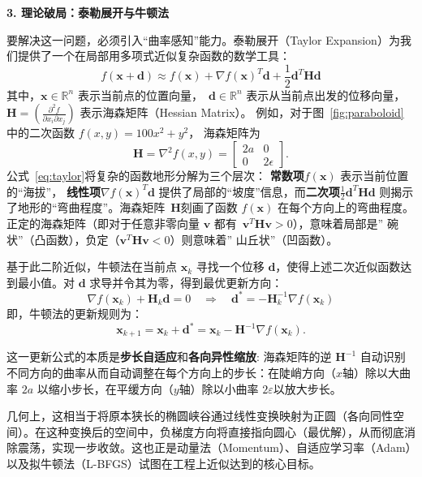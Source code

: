 \textbf{3. 理论破局：泰勒展开与牛顿法}

要解决这一问题，必须引入“曲率感知”能力。泰勒展开（Taylor Expansion）为我们提供了一个在局部用多项式近似复杂函数的数学工具：
\begin{equation}\label{eq:taylor}
f(\mathbf{x}+\mathbf{d}) \approx f(\mathbf{x}) + \nabla f(\mathbf{x})^T\mathbf{d}
+ \frac{1}{2}\mathbf{d}^T\mathbf{H}\mathbf{d}
\end{equation}
其中，$\mathbf{x}\in \mathbb{R}^n$ 表示当前点的位置向量，~$\mathbf{d}\in \mathbb{R}^n$ 表示从当前点出发的位移向量，$\mathbf{H} = \left(\frac{\partial^2 f}{\partial x_i \partial x_j} \right)$ 表示海森矩阵（Hessian Matrix）。 例如，对于图~\ref{fig:paraboloid} 中的二次函数 $ f(x,y) = 100 x^2 + y^2$，  海森矩阵为
\[
\mathbf{H} = \nabla^2 f(x,y) =
\begin{bmatrix}
2a & 0 \\
0 & 2\epsilon
\end{bmatrix}.
\]
公式~\eqref{eq:taylor}将复杂的函数地形分解为三个层次：
\textbf{常数项}$f(\mathbf{x})$ 表示当前位置的``海拔''，
\textbf{线性项}$\nabla f(\mathbf{x})^T\mathbf{d}$ 提供了局部的``坡度''信息，而\textbf{二次项}$\frac{1}{2}\mathbf{d}^T\mathbf{H}\mathbf{d}$ 则揭示了地形的``弯曲程度''。海森矩阵~$\mathbf{H}  $刻画了函数 $f(\mathbf{x})$ 在每个方向上的弯曲程度。正定的海森矩阵（即对于任意非零向量 $\mathbf{v}$ 都有~$\mathbf{v}^T \mathbf{H} \mathbf{v} >0$），意味着局部是” 碗状”（凸函数），负定（$\mathbf{v}^T \mathbf{H} \mathbf{v}<0$）则意味着” 山丘状”（凹函数）。

基于此二阶近似，牛顿法在当前点 $\mathbf{x}_k$ 寻找一个位移 $\mathbf{d}$，使得上述二次近似函数达到最小值。对 $\mathbf{d}$ 求导并令其为零，得到最优更新方向：
$$
\nabla f(\mathbf{x}_k) + \mathbf{H}_k \mathbf{d} = 0 \quad \Rightarrow \quad \mathbf{d}^* = -\mathbf{H}_k^{-1} \nabla f(\mathbf{x}_k)
$$
即，牛顿法的更新规则为：
$$
\mathbf{x}_{k+1} = \mathbf{x}_k + \mathbf{d}^* = \mathbf{x}_k - \mathbf{H}^{-1} \nabla f(\mathbf{x}_k).
$$

这一更新公式的本质是\textbf{步长自适应}和\textbf{各向异性缩放}: 海森矩阵的逆 $\mathbf{H}^{-1}$ 自动识别不同方向的曲率从而自动调整在每个方向上的步长：在陡峭方向（$x$轴）除以大曲率 $2a$ 以缩小步长，在平缓方向（$y$轴）除以小曲率 $2\varepsilon$以放大步长。

几何上，这相当于将原本狭长的椭圆峡谷通过线性变换映射为正圆（各向同性空间）。在这种变换后的空间中，负梯度方向将直接指向圆心（最优解），从而彻底消除震荡，实现一步收敛。这也正是动量法（Momentum）、自适应学习率（Adam）以及拟牛顿法（L-BFGS）试图在工程上近似达到的核心目标。

